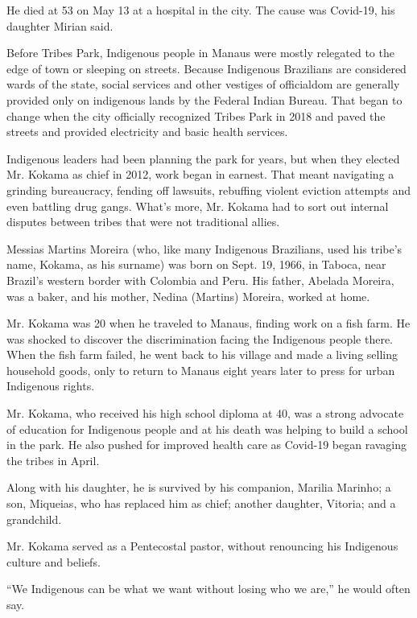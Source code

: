He died at 53 on May 13 at a hospital in the city. The cause was
Covid-19, his daughter Mirian said.

Before Tribes Park, Indigenous people in Manaus were mostly relegated to
the edge of town or sleeping on streets. Because Indigenous Brazilians
are considered wards of the state, social services and other vestiges of
officialdom are generally provided only on indigenous lands by the
Federal Indian Bureau. That began to change when the city officially
recognized Tribes Park in 2018 and paved the streets and provided
electricity and basic health services.

Indigenous leaders had been planning the park for years, but when they
elected Mr. Kokama as chief in 2012, work began in earnest. That meant
navigating a grinding bureaucracy, fending off lawsuits, rebuffing
violent eviction attempts and even battling drug gangs. What's more, Mr.
Kokama had to sort out internal disputes between tribes that were not
traditional allies.

Messias Martins Moreira (who, like many Indigenous Brazilians, used his
tribe's name, Kokama, as his surname) was born on Sept. 19, 1966, in
Taboca, near Brazil's western border with Colombia and Peru. His father,
Abelada Moreira, was a baker, and his mother, Nedina (Martins) Moreira,
worked at home.

Mr. Kokama was 20 when he traveled to Manaus, finding work on a fish
farm. He was shocked to discover the discrimination facing the
Indigenous people there. When the fish farm failed, he went back to his
village and made a living selling household goods, only to return to
Manaus eight years later to press for urban Indigenous rights.

Mr. Kokama, who received his high school diploma at 40, was a strong
advocate of education for Indigenous people and at his death was helping
to build a school in the park. He also pushed for improved health care
as Covid-19 began ravaging the tribes in April.

Along with his daughter, he is survived by his companion, Marilia
Marinho; a son, Miqueias, who has replaced him as chief; another
daughter, Vitoria; and a grandchild.

Mr. Kokama served as a Pentecostal pastor, without renouncing his
Indigenous culture and beliefs.

``We Indigenous can be what we want without losing who we are,'' he
would often say.

\href{https://www.nytimes.com/interactive/2020/obituaries/people-died-coronavirus-obituaries.html?action=click\&pgtype=Article\&state=default\&region=BELOW_MAIN_CONTENT\&context=covid_obits_promo}{}

